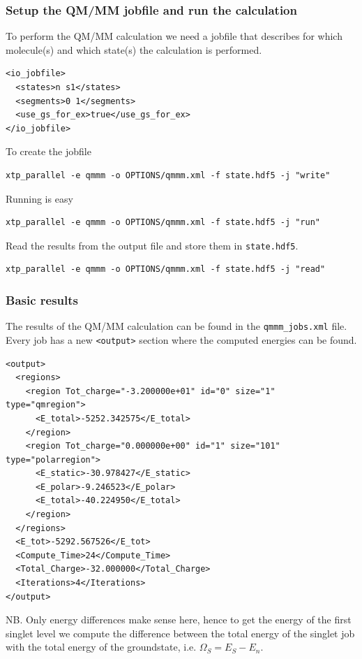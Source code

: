 \documentclass[t,aspectratio=169, 8pt]{beamer}
\begin{document}
\begin{frame}[fragile]
  \frametitle{Setup the QM/MM jobfile and run the calculation}
  To perform the QM/MM calculation we need a jobfile that describes for which molecule(s) and which state(s) the calculation is performed. 
  \begin{verbatim}
<io_jobfile>
  <states>n s1</states>
  <segments>0 1</segments>
  <use_gs_for_ex>true</use_gs_for_ex>
</io_jobfile>
  \end{verbatim}
  To create the jobfile
  \begin{verbatim}
xtp_parallel -e qmmm -o OPTIONS/qmmm.xml -f state.hdf5 -j "write"
  \end{verbatim}
  Running is easy
  \begin{verbatim}
xtp_parallel -e qmmm -o OPTIONS/qmmm.xml -f state.hdf5 -j "run"
  \end{verbatim}
  Read the results from the output file and store them in \texttt{state.hdf5}.
  \begin{verbatim}
xtp_parallel -e qmmm -o OPTIONS/qmmm.xml -f state.hdf5 -j "read"
  \end{verbatim}

\end{frame}

\begin{frame}[fragile]
  \frametitle{Basic results}
  The results of the QM/MM calculation can be found in the \texttt{qmmm_jobs.xml} file.
  \vspace{0.1cm}\\
  Every job has a new \texttt{<output>} section where the computed energies can be found.
  \begin{verbatim}
<output>
  <regions>
    <region Tot_charge="-3.200000e+01" id="0" size="1" type="qmregion">
      <E_total>-5252.342575</E_total>
    </region>
    <region Tot_charge="0.000000e+00" id="1" size="101" type="polarregion">
      <E_static>-30.978427</E_static>
      <E_polar>-9.246523</E_polar>
      <E_total>-40.224950</E_total>
    </region>
  </regions>
  <E_tot>-5292.567526</E_tot>
  <Compute_Time>24</Compute_Time>
  <Total_Charge>-32.000000</Total_Charge>
  <Iterations>4</Iterations>
</output>
  \end{verbatim}
\small
NB. Only energy differences make sense here, hence to get the energy of the first singlet level we compute the difference between the total energy of the singlet job with the total energy of the groundstate, i.e. $\Omega_S = E_S - E_n$.
\end{frame}
\end{document}
